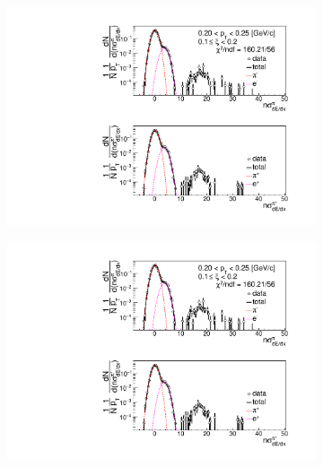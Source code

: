 \begin{figure}[h!]
\begin{subfigure}{.3\textwidth}
	\end{subfigure}
	\begin{subfigure}{.33\textwidth}
		\includegraphics[width=\linewidth, page=4]{chapters/chrgSTAR/img/dEdx/fit2019_secondStep_0_2.pdf}
	\end{subfigure}
	\begin{subfigure}{.33\textwidth}
		\includegraphics[width=\linewidth, page=5]{chapters/chrgSTAR/img/dEdx/fit2019_secondStep_0_2.pdf}
	\end{subfigure}
	\begin{subfigure}{.3\textwidth}

\end{subfigure}
\end{figure}
